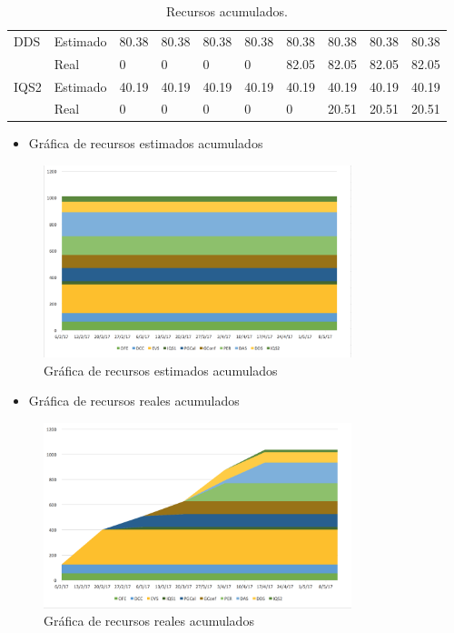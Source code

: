 \begin{table}[h]
\begin{center}
\begin{tabular}{ p{1.75cm}  p{1.25cm}  p{1.25cm} p{1.25cm}  p{1.25cm}  p{1.25cm}  p{1.25cm}  p{1.25cm} p{1.25cm} p{1.25cm}}
	 DDS & Estimado & 80.38 &  80.38  &  80.38  &  80.38 &  80.38 &  80.38 &  80.38 & 80.38 \\
 	 			& Real & 0 & 0 & 0 & 0 &  82.05 &  82.05 &  82.05 & 82.05 \\ \hline

	 IQS2 & Estimado & 40.19 &  40.19  &  40.19  &  40.19 &  40.19 &  40.19 &  40.19 & 40.19 \\
 	 			& Real & 0 & 0 & 0 & 0 & 0 &  20.51 &  20.51 & 20.51 \\ \hline


\end{tabular}
\caption{Recursos acumulados.}
\label{tab:Recursos acumulados_2}
\end{center}
\end{table}
\pagebreak
\begin{itemize}
\item Gráfica de recursos estimados acumulados
\end{itemize}

\begin{figure}[H]
\begin{center}
\includegraphics[width=0.8\textwidth]{./img/estimados2.png}
\end{center}
\caption{Gráfica de recursos estimados acumulados}
\label{fig:estimados2}
\end{figure}

\begin{itemize}
\item Gráfica de recursos reales acumulados
\end{itemize}

\begin{figure}[H]
\begin{center}
\includegraphics[width=0.8\textwidth]{./img/reales2.png}
\end{center}
\caption{Gráfica de recursos reales acumulados}
\label{fig:reales2}
\end{figure}

\newpage
